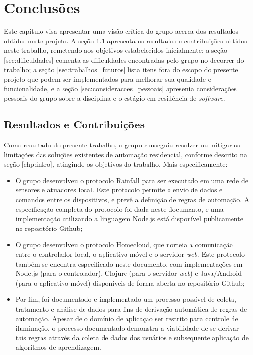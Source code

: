 \chapter{Conclusões}\label{chp:conclusoes}
Este capítulo visa apresentar uma visão crítica do grupo acerca dos resultados obtidos neste projeto. A seção \ref{sec:resultados} apresenta os resultados e contribuições obtidos neste trabalho, remetendo aos objetivos estabelecidos inicialmente; a seção \ref{sec:dificuldades} comenta as dificuldades encontradas pelo grupo no decorrer do trabalho; a seção \ref{sec:trabalhos_futuros} lista itens fora do escopo do presente projeto que podem ser implementados para melhorar sua qualidade e funcionalidade, e a seção \ref{sec:consideracoes_pessoais} apresenta considerações pessoais do grupo sobre a disciplina e o estágio em residência de \textit{software}.

\section{Resultados e Contribuições} \label{sec:resultados}
Como resultado do presente trabalho, o grupo conseguiu resolver ou mitigar as limitações das soluções existentes de automação residencial, conforme descrito na seção \ref{chp:intro}, atingindo os objetivos do trabalho. Mais especificamente:

\begin{itemize}
	\item O grupo desenvolveu o protocolo Rainfall para ser executado em uma rede de sensores e atuadores local. Este protocolo permite o envio de dados e comandos entre os dispositivos, e prevê a definição de regras de automação. A especificação completa do protocolo foi dada neste documento, e uma implementação utilizando a linguagem Node.js está disponível publicamente no repositório Github;
	
	\item O grupo desenvolveu o protocolo Homecloud, que norteia a comunicação entre o controlador local, o aplicativo móvel e o servidor \textit{web}. Este protocolo também se encontra especificado neste documento, com implementações em Node.js (para o controlador), Clojure (para o servidor \textit{web}) e Java/Android (para o aplicativo móvel) disponíveis de forma aberta no repositório Github;
	
	\item Por fim, foi documentado e implementado um processo possível de coleta, tratamento e análise de dados para fins de derivação automática de regras de automação. Apesar de o domínio de aplicação ser restrito para controle de iluminação, o processo documentado demonstra a viabilidade de se derivar tais regras através da coleta de dados dos usuários e subsequente aplicação de algoritmos de aprendizagem.
\end{itemize}

